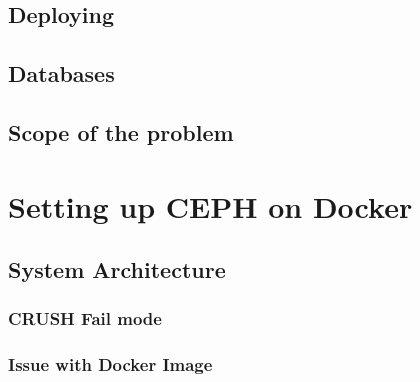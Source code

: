 \documentclass[titlepage, a4paper, 11pt]{scrartcl}
\begin{document}

        \subsection{Deploying}        


        \subsection{Databases}


        \subsection{Scope of the problem}


    \section{Setting up CEPH on Docker}

        \subsection{System Architecture}


            \subsubsection{CRUSH Fail mode}



            \subsubsection{Issue with Docker Image}

\end{document}
